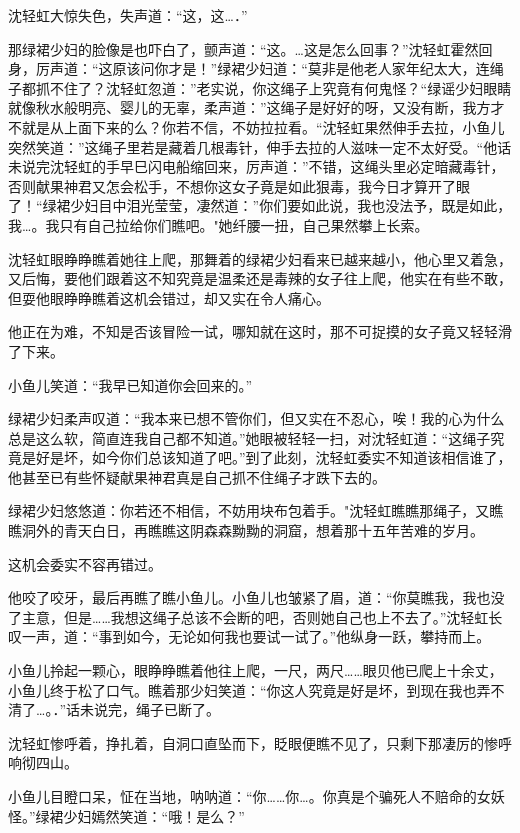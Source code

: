 \documentclass[12pt,oneside]{book}
\begin{document}
沈轻虹大惊失色，失声道：``这，这\ldots．''

那绿裙少妇的脸像是也吓白了，颤声道：``这。\ldots 这是怎么回事？''沈轻虹霍然回身，厉声道：``这原该问你才是！''绿裙少妇道：``莫非是他老人家年纪太大，连绳子都抓不住了？沈轻虹忽道：''老实说，你这绳子上究竟有何鬼怪？``绿谣少妇眼睛就像秋水般明亮、婴儿的无辜，柔声道：''这绳子是好好的呀，又没有断，我方才不就是从上面下来的么？你若不信，不妨拉拉看。``沈轻虹果然伸手去拉，小鱼儿突然笑道：''这绳子里若是藏着几根毒针，伸手去拉的人滋味一定不太好受。``他话未说完沈轻虹的手早巳闪电船缩回来，厉声道：''不错，这绳头里必定暗藏毒针，否则献果神君又怎会松手，不想你这女子竟是如此狠毒，我今日才算开了眼了！``绿裙少妇目中泪光莹莹，凄然道：''你们要如此说，我也没法予，既是如此，我\ldots。我只有自己拉给你们瞧吧。"她纤腰一扭，自己果然攀上长索。

沈轻虹眼睁睁瞧着她往上爬，那舞着的绿裙少妇看来已越来越小，他心里又着急，又后悔，要他们跟着这不知究竟是温柔还是毒辣的女子往上爬，他实在有些不敢，但耍他眼睁睁瞧着这机会错过，却又实在令人痛心。

他正在为难，不知是否该冒险一试，哪知就在这时，那不可捉摸的女子竟又轻轻滑了下来。

小鱼儿笑道：``我早已知道你会回来的。''

绿裙少妇柔声叹道：``我本来已想不管你们，但又实在不忍心，唉！我的心为什么总是这么软，简直连我自己都不知道。''她眼被轻轻一扫，对沈轻虹道：``这绳子究竟是好是坏，如今你们总该知道了吧。''到了此刻，沈轻虹委实不知道该相信谁了，他甚至已有些怀疑献果神君真是自己抓不住绳子才跌下去的。

绿裙少妇悠悠道：你若还不相信，不妨用块布包着手。"沈轻虹瞧瞧那绳子，又瞧瞧洞外的青天白日，再瞧瞧这阴森森黝黝的洞窟，想着那十五年苦难的岁月。

这机会委实不容再错过。

他咬了咬牙，最后再瞧了瞧小鱼儿。小鱼儿也皱紧了眉，道：``你莫瞧我，我也没了主意，但是\ldots\ldots 我想这绳子总该不会断的吧，否则她自己也上不去了。''沈轻虹长叹一声，道：``事到如今，无论如何我也要试一试了。''他纵身一跃，攀持而上。

小鱼儿拎起一颗心，眼睁睁瞧着他往上爬，一尺，两尺\ldots\ldots 眼贝他已爬上十余丈，小鱼儿终于松了口气。瞧着那少妇笑道：``你这人究竟是好是坏，到现在我也弄不清了\ldots。．''话未说完，绳子已断了。

沈轻虹惨呼着，挣扎着，自洞口直坠而下，眨眼便瞧不见了，只剩下那凄厉的惨呼响彻四山。

小鱼儿目瞪口呆，怔在当地，呐呐道：``你\ldots\ldots 你\ldots。你真是个骗死人不赔命的女妖怪。''绿裙少妇嫣然笑道：``哦！是么？''
\end{document}
